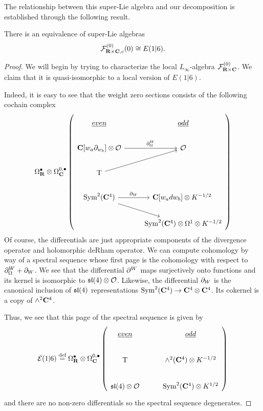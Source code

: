 \documentclass[../main.tex]{subfiles}
\begin{document}
The relationship between this super-Lie algebra and our decomposition is established through the following result.

\begin{prop}
There is an equivalence of super-Lie algebras
\[
\mathcal{F}^{(0)}_{\mathbf{R}\times \mathbf{C}, c}  (0) \cong E(1|6).
\]
\end{prop}
\begin{proof}
We will begin by trying to characterize the local $L_\infty$-algebra $\mathcal{F}^{(0)}_{\mathbf{R}\times \mathbf{C}}$. We claim that it is quasi-isomorphic to a local version of $E(1|6)$. 

Indeed, it is easy to see that the weight zero sections consists of the following cochain complex 
\begin{equation}
\Omega^\bullet _\R \otimes \Omega^{0,\bullet}_\C \left (
\begin{tikzcd}
\ul{even} & \ul{odd} \\
\C[w_a\del_{w_b}]\otimes \mc O\ar[r, "\del^W_\Omega"]  & \mc O \\ 
\T \ar[ur] & \\
\Sym^2 (\C^4)\ar[r, "\del_W"]\ar[dr] & \C[w_adw_b] \otimes K^{-1/2}\ \\
& \Sym^2 (\C^4)\otimes \Omega^1\otimes K^{-1/2}
\end{tikzcd} \right)
\end{equation}
Of course, the differentials are just appropriate components of the divergence operator and holomorphic deRham operator. We can compute cohomology by way of a spectral sequence whose first page is the cohomology with respect to $\partial^W_\Omega + \partial_W$. We see that the differential $\partial^W$ maps surjectively onto functions and its kernel is isomorphic to $\mathfrak{sl}(4)\otimes \mathcal{O}$. Likewise, the differential $\partial_W$ is the canonical inclusion of $\mathfrak{sl}(4)$ representations $\text{Sym}^2 (\mathbf{C}^4)\to \mathbf{C}^4\otimes \mathbf{C}^4$. Its cokernel is a copy of $\wedge^2 \mathbf{C}^4$. 

Thus, we see that this page of the spectral sequence is given by
\begin{equation}
\mc E(1|6) \define \Omega^\bullet _\R \otimes \Omega^{0,\bullet}_\C \left (
\begin{tikzcd}
\ul{even} & \ul{odd} \\
\T & \wedge^2 (\C^4) \otimes K^{-1/2} \\
\mf {sl}(4)\otimes \mc O & \Sym^2 (\C^4)\otimes K^{1/2}
\end{tikzcd} \right)
\end{equation}
and there are no non-zero differentials so the spectral sequence degenerates.


\end{proof}
\end{document}
